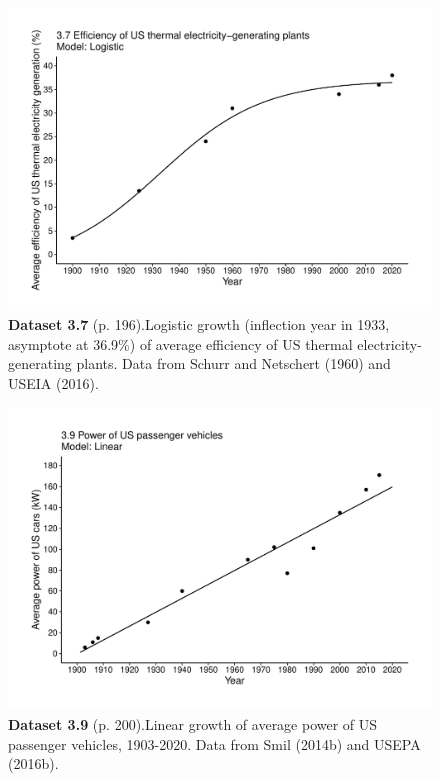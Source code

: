 \documentclass[aps,rmp,preprint,superscriptaddress,10pt,onecolumn]{article}
\begin{document}
\clearpage
\begin{figure}[h]
\includegraphics[width=\textwidth]{output/figs-ggplot/3.7.pdf}
\caption*{\textbf{Dataset 3.7} (p. 196).Logistic growth (inflection year in 1933, asymptote at 36.9\%) of average efficiency of US thermal electricity-generating plants. Data from Schurr and Netschert (1960) and USEIA (2016).}
\end{figure}
	
\clearpage
\begin{figure}[h]
\includegraphics[width=\textwidth]{output/figs-ggplot/3.9.pdf}
\caption*{\textbf{Dataset 3.9} (p. 200).Linear growth of average power of US passenger vehicles, 1903-2020. Data from Smil (2014b) and USEPA (2016b).}
\end{figure}
	
\end{document}
